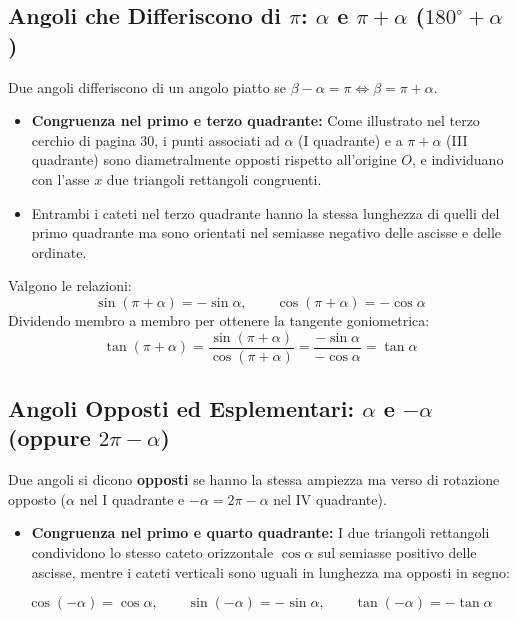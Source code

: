 \documentclass[11pt,a4paper,oneside]{report}
\begin{document}
\subsection{Angoli che Differiscono di $\pi$: $\alpha$ e $\pi + \alpha$ ($180^\circ + \alpha$)}
Due angoli differiscono di un angolo piatto se $\beta - \alpha = \pi \iff \beta = \pi + \alpha$.
\begin{itemize}[leftmargin=*, label=\textbullet]
    \item \textbf{Congruenza nel primo e terzo quadrante:} Come illustrato nel terzo cerchio di pagina 30, i punti associati ad $\alpha$ (I quadrante) e a $\pi + \alpha$ (III quadrante) sono diametralmente opposti rispetto all'origine $O$, e individuano con l'asse $x$ due triangoli rettangoli congruenti.
    \item Entrambi i cateti nel terzo quadrante hanno la stessa lunghezza di quelli del primo quadrante ma sono orientati nel semiasse negativo delle ascisse e delle ordinate.
\end{itemize}
Valgono le relazioni:
\begin{equation}
    \sin(\pi + \alpha) = -\sin\alpha, \qquad \cos(\pi + \alpha) = -\cos\alpha
\end{equation}
Dividendo membro a membro per ottenere la tangente goniometrica:
\begin{equation}
    \tan(\pi + \alpha) = \frac{\sin(\pi + \alpha)}{\cos(\pi + \alpha)} = \frac{-\sin\alpha}{-\cos\alpha} = \tan\alpha
\end{equation}

\subsection{Angoli Opposti ed Esplementari: $\alpha$ e $-\alpha$ (oppure $2\pi - \alpha$)}
Due angoli si dicono \textbf{opposti} se hanno la stessa ampiezza ma verso di rotazione opposto ($\alpha$ nel I quadrante e $-\alpha = 2\pi - \alpha$ nel IV quadrante).
\begin{itemize}[leftmargin=*, label=\textbullet]
    \item \textbf{Congruenza nel primo e quarto quadrante:} I due triangoli rettangoli condividono lo stesso cateto orizzontale $\cos\alpha$ sul semiasse positivo delle ascisse, mentre i cateti verticali sono uguali in lunghezza ma opposti in segno:
\end{itemize}
\begin{equation}
    \cos(-\alpha) = \cos\alpha, \qquad \sin(-\alpha) = -\sin\alpha, \qquad \tan(-\alpha) = -\tan\alpha
\end{equation}
\end{document}
